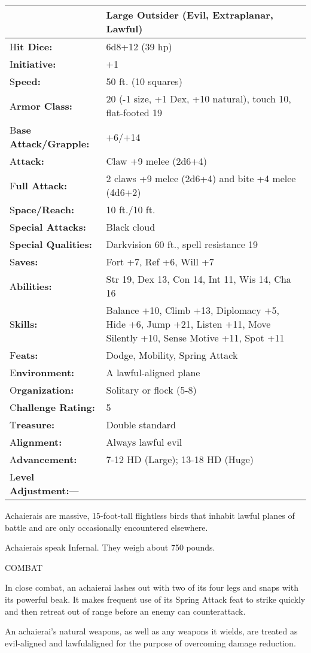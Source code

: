 \documentclass{article}
\begin{document}
\begin{tabular}{|>{\raggedright}p{91pt}|>{\raggedright}p{231pt}|}
\hline
 & Large Outsider (Evil, Extraplanar, Lawful)\tabularnewline
\hline
H\textbf{it Dice:} & 6d8+12 (39 hp)\tabularnewline
\hline
I\textbf{nitiative:} & +1\tabularnewline
\hline
S\textbf{peed:} & 50 ft. (10 squares)\tabularnewline
\hline
A\textbf{rmor Class:} & 20 (-1 size, +1 Dex, +10 natural), touch 10, flat-footed 
19\tabularnewline
\hline
B\textbf{ase Attack/Grapple:} & +6/+14\tabularnewline
\hline
A\textbf{ttack:} & Claw +9 melee (2d6+4)\tabularnewline
\hline
F\textbf{ull Attack:} & 2 claws +9 melee (2d6+4) and bite +4 melee (4d6+2)\tabularnewline
\hline
S\textbf{pace/Reach:} & 10 ft./10 ft.\tabularnewline
\hline
S\textbf{pecial Attacks:} & Black cloud\tabularnewline
\hline
S\textbf{pecial Qualities:} & Darkvision 60 ft., spell resistance 19\tabularnewline
\hline
S\textbf{aves:} & Fort +7, Ref +6, Will +7\tabularnewline
\hline
A\textbf{bilities:} & Str 19, Dex 13, Con 14, Int 11, Wis 14, Cha 16\tabularnewline
\hline
S\textbf{kills:} & Balance +10, Climb +13, Diplomacy +5, Hide +6, Jump +21, Listen 
+11, Move Silently +10, Sense Motive +11, Spot +11\tabularnewline
\hline
F\textbf{eats:} & Dodge, Mobility, Spring Attack\tabularnewline
\hline
E\textbf{nvironment:} & A lawful-aligned plane\tabularnewline
\hline
O\textbf{rganization:} & Solitary or flock (5-8)\tabularnewline
\hline
C\textbf{hallenge Rating:} & 5\tabularnewline
\hline
T\textbf{reasure:} & Double standard\tabularnewline
\hline
A\textbf{lignment:} & Always lawful evil\tabularnewline
\hline
A\textbf{dvancement:} & 7-12 HD (Large); 13-18 HD (Huge)\tabularnewline
\hline
L\textbf{evel Adjustment:}--- & \tabularnewline
\hline
\end{tabular}

Achaierais are massive, 15-foot-tall flightless birds that inhabit lawful planes 
of battle and are only occasionally encountered elsewhere. 

Achaierais speak Infernal. They weigh about 750 pounds.

COMBAT

In close combat, an achaierai lashes out with two of its four legs and snaps with 
its powerful beak. It makes frequent use of its Spring Attack feat to strike quickly 
and then retreat out of range before an enemy can counterattack.

An achaierai's natural weapons, as well as any weapons it wields, are treated as 
evil-aligned and lawfulaligned for the purpose of overcoming damage reduction.
\end{document}
